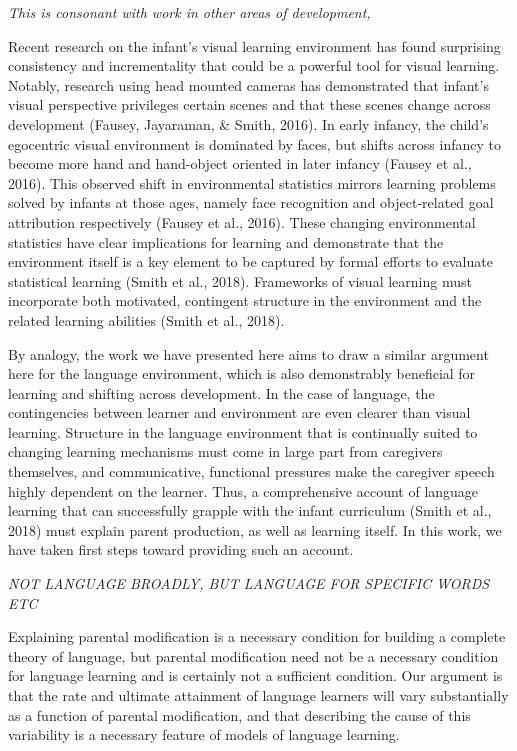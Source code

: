 \documentclass[english,,man,floatsintext]{apa6}
\begin{document}
\emph{This is consonant with work in other areas of development, }

Recent research on the infant's visual learning environment has found surprising consistency and incrementality that could be a powerful tool for visual learning. Notably, research using head mounted cameras has demonstrated that infant's visual perspective privileges certain scenes and that these scenes change across development (Fausey, Jayaraman, \& Smith, 2016). In early infancy, the child's egocentric visual environment is dominated by faces, but shifts across infancy to become more hand and hand-object oriented in later infancy (Fausey et al., 2016). This observed shift in environmental statistics mirrors learning problems solved by infants at those ages, namely face recognition and object-related goal attribution respectively (Fausey et al., 2016). These changing environmental statistics have clear implications for learning and demonstrate that the environment itself is a key element to be captured by formal efforts to evaluate statistical learning (Smith et al., 2018). Frameworks of visual learning must incorporate both motivated, contingent structure in the environment and the related learning abilities (Smith et al., 2018).

By analogy, the work we have presented here aims to draw a similar argument here for the language environment, which is also demonstrably beneficial for learning and shifting across development. In the case of language, the contingencies between learner and environment are even clearer than visual learning. Structure in the language environment that is continually suited to changing learning mechanisms must come in large part from caregivers themselves, and communicative, functional pressures make the caregiver speech highly dependent on the learner. Thus, a comprehensive account of language learning that can successfully grapple with the infant curriculum (Smith et al., 2018) must explain parent production, as well as learning itself. In this work, we have taken first steps toward providing such an account.

\emph{NOT LANGUAGE BROADLY, BUT LANGUAGE FOR SPECIFIC WORDS ETC}

Explaining parental modification is a necessary condition for building a complete theory of language, but parental modification need not be a necessary condition for language learning and is certainly not a sufficient condition. Our argument is that the rate and ultimate attainment of language learners will vary substantially as a function of parental modification, and that describing the cause of this variability is a necessary feature of models of language learning.
\end{document}
